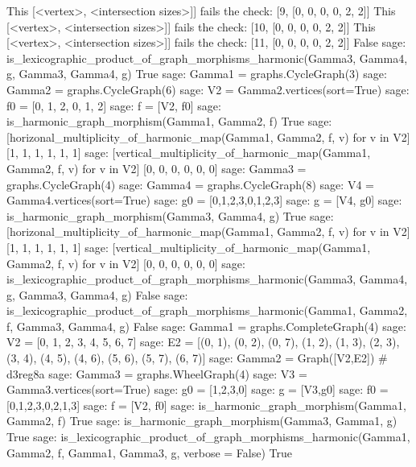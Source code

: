 \documentclass{article}
\begin{document}
{{\begin{spverbatim}
    This [<vertex>, <intersection sizes>]] fails the check: [9, [0, 0, 0, 0, 2, 2]]
    This [<vertex>, <intersection sizes>]] fails the check: [10, [0, 0, 0, 0, 2, 2]]
    This [<vertex>, <intersection sizes>]] fails the check: [11, [0, 0, 0, 0, 2, 2]]
    False
    sage: is_lexicographic_product_of_graph_morphisms_harmonic(Gamma3, Gamma4, g, Gamma3, Gamma4, g)                 
    True
    sage: Gamma1 = graphs.CycleGraph(3)                                                      
    sage: Gamma2 = graphs.CycleGraph(6)                                                      
    sage: V2 = Gamma2.vertices(sort=True)                                             
    sage: f0 = [0, 1, 2, 0, 1, 2]                                                            
    sage: f = [V2, f0]                                                                       
    sage: is_harmonic_graph_morphism(Gamma1, Gamma2, f)                                
    True
    sage: [horizonal_multiplicity_of_harmonic_map(Gamma1, Gamma2, f, v) for v in V2] 
    [1, 1, 1, 1, 1, 1]
    sage: [vertical_multiplicity_of_harmonic_map(Gamma1, Gamma2, f, v) for v in V2]   
    [0, 0, 0, 0, 0, 0]
    sage: Gamma3 = graphs.CycleGraph(4)                                                   
    sage: Gamma4 = graphs.CycleGraph(8)                                                      
    sage: V4 = Gamma4.vertices(sort=True)                                                
    sage: g0 = [0,1,2,3,0,1,2,3]                                                            
    sage: g = [V4, g0]                                                                       
    sage: is_harmonic_graph_morphism(Gamma3, Gamma4, g)                                      
    True
    sage: [horizonal_multiplicity_of_harmonic_map(Gamma1, Gamma2, f, v) for v in V2]         
    [1, 1, 1, 1, 1, 1]
    sage: [vertical_multiplicity_of_harmonic_map(Gamma1, Gamma2, f, v) for v in V2]          
    [0, 0, 0, 0, 0, 0]
    sage: is_lexicographic_product_of_graph_morphisms_harmonic(Gamma3, Gamma4, g, Gamma3, Gamma4, g)                 
    False
    sage: is_lexicographic_product_of_graph_morphisms_harmonic(Gamma1, Gamma2, f, Gamma3, Gamma4, g)   
    False
    sage: Gamma1 = graphs.CompleteGraph(4)
    sage: V2 = [0, 1, 2, 3, 4, 5, 6, 7] 
    sage: E2 = [(0, 1), (0, 2), (0, 7), (1, 2), (1, 3), (2, 3), (3, 4), (4, 5), (4, 6), (5, 6), (5, 7), (6, 7)]
    sage: Gamma2 = Graph([V2,E2]) # d3reg8a
    sage: Gamma3 = graphs.WheelGraph(4)
    sage: V3 = Gamma3.vertices(sort=True)
    sage: g0 = [1,2,3,0]
    sage: g = [V3,g0]
    sage: f0 = [0,1,2,3,0,2,1,3]
    sage: f = [V2, f0]
    sage: is_harmonic_graph_morphism(Gamma1, Gamma2, f)
    True
    sage: is_harmonic_graph_morphism(Gamma3, Gamma1, g)
    True                   
    sage: is_lexicographic_product_of_graph_morphisms_harmonic(Gamma1, Gamma2, f, Gamma1, Gamma3, g, verbose = False)
    True 
\end{spverbatim}
}}
    
\end{document}
